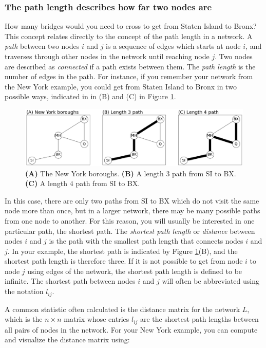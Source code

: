 \subsubsection{The path length describes how far two nodes are}
\label{sec:ch4:prop-net:path}
How many bridges would you need to cross to get from Staten Island to Bronx? This concept relates directly to the concept of the {path length} in a network. A \textit{path} between two nodes $i$ and $j$ is a sequence of edges which starts at node $i$, and traverses through other nodes in the network until reaching node $j$. Two nodes are described as \textit{connected} if a path exists between them. The \textit{path length} is the number of edges in the path. For instance, if you remember your network from the New York example, you could get from Staten Island to Bronx in two possible ways, indicated in in (B) and (C) in Figure \ref{fig:ch4:path}.

\begin{figure}[h]
    \centering
    \includegraphics[width=\linewidth]{representations/ch4/Images/path.png}
    \caption[Path length in New York boroughs]{\textbf{(A)} The New York boroughs. \textbf{(B)} A length $3$ path from SI to BX. \textbf{(C)} A length $4$ path from SI to BX.}
    \label{fig:ch4:path}
\end{figure}
In this case, there are only two paths from SI to BX which do not visit the same node more than once, but in a larger network, there may be {many} possible paths from one node to another. For this reason, you will usually be interested in one particular path, the {shortest path}. The \textit{shortest path length} or \textit{distance} between nodes $i$ and $j$ is the path with the smallest path length that connects nodes $i$ and $j$. In your example, the shortest path is indicated by Figure \ref{fig:ch4:path}(B), and the shortest path length is therefore three.  If it is not possible to get from node $i$ to node $j$ using edges of the network, the shortest path length is defined to be infinite. The shortest path between nodes $i$ and $j$ will often be abbreviated using the notation $l_{ij}$.

A common statistic often calculated is the {distance matrix} for the network $L$, which is the $n \times n$ matrix whose entries $l_{ij}$ are the shortest path lengths between all pairs of nodes in the network. For your New York example, you can compute and visualize the distance matrix using:

